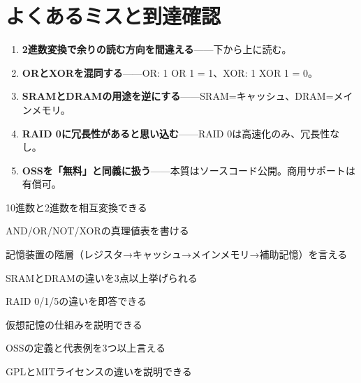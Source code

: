 \section{よくあるミスと到達確認}

\begin{yokumiss}[この章でよくあるミス]
\begin{enumerate}[leftmargin=1.6em, itemsep=5pt]
  \item \textbf{2進数変換で余りの読む方向を間違える}——下から上に読む。
  \item \textbf{ORとXORを混同する}——OR: 1 OR 1 = 1、XOR: 1 XOR 1 = 0。
  \item \textbf{SRAMとDRAMの用途を逆にする}——SRAM=キャッシュ、DRAM=メインメモリ。
  \item \textbf{RAID 0に冗長性があると思い込む}——RAID 0は高速化のみ、冗長性なし。
  \item \textbf{OSSを「無料」と同義に扱う}——本質はソースコード公開。商用サポートは有償可。
\end{enumerate}
\end{yokumiss}

\begin{tatsaku}
  \item 10進数と2進数を相互変換できる
  \item AND/OR/NOT/XORの真理値表を書ける
  \item 記憶装置の階層（レジスタ→キャッシュ→メインメモリ→補助記憶）を言える
  \item SRAMとDRAMの違いを3点以上挙げられる
  \item RAID 0/1/5の違いを即答できる
  \item 仮想記憶の仕組みを説明できる
  \item OSSの定義と代表例を3つ以上言える
  \item GPLとMITライセンスの違いを説明できる
\end{tatsaku}

